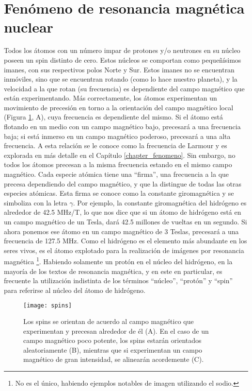 \section{Fenómeno de resonancia magnética nuclear}
Todos los átomos con un número impar de protones y/o neutrones en su núcleo poseen un spin distinto de cero. Estos núcleos se comportan como pequeñísimos imanes, con sus respectivos polos Norte y Sur. Estos imanes no se encuentran inmóviles, sino que se encuentran rotando (como lo hace nuestro planeta), y la velocidad a la que rotan (su frecuencia) es dependiente del campo magnético que están experimentando. Más correctamente, los átomos experimentan un movimiento de precesión  en torno a la orientación del campo magnético local (Figura \ref{fig:spins}, A), cuya frecuencia es dependiente del mismo. Si el átomo está flotando en un medio con un campo magnético bajo, precesará a una frecuencia baja; si está inmerso en un campo magnético poderoso, precesará a una alta frecuencia. A esta relación se le conoce como la frecuencia de Larmour y es explorada en más detalle en el Capítulo \ref{chapter_fenomeno}. Sin embargo, no todos los átomos precesan a la misma frecuencia estando en el mismo campo magnético. Cada especie atómica tiene una ``firma'', una frecuencia a la que precesa dependiendo del campo magnético, y que la distingue de todas las otras especies atómicas. Esta firma se conoce como la constante giromagnética  y se simboliza con la letra $\gamma$. Por ejemplo, la constante giromagnética del hidrógeno es alrededor de 42.5 MHz/T, lo que nos dice que si un átomo de hidrógeno está en un campo magnético de un Tesla, dará 42.5 millones de vueltas en un segundo. Si ahora ponemos ese átomo en un campo magnético de 3 Teslas, precesará a una frecuencia de 127.5 MHz. Como el hidrógeno es el elemento más abundante en los seres vivos, es el átomo explotado para la realización de imágenes por resonancia magnética \footnote{No es el único, habiendo ejemplos notables de imagen utilizando el sodio.}. Habiendo solamente un protón en el núcleo del hidrógeno, en la mayoría de los textos de resonancia magnética, y en este en particular, es frecuente la utilización indistinta de los términos ``núcleo'', ``protón'' y ``spin'' para referirse al núcleo del átomo de hidrógeno.

\begin{figure}[htb]
 \centering
 \texttt{[image: spins]}
 \caption{Los spins se orientan de acuerdo al campo magnético que experimentan y precesan alrededor de él (A). En el caso de un campo magnético poco potente, los spins estarán orientados aleatoriamente (B), mientras que si experimentan un campo magnético de gran intensidad, se alinearán acordemente (C).}
 \label{fig:spins}
\end{figure}




